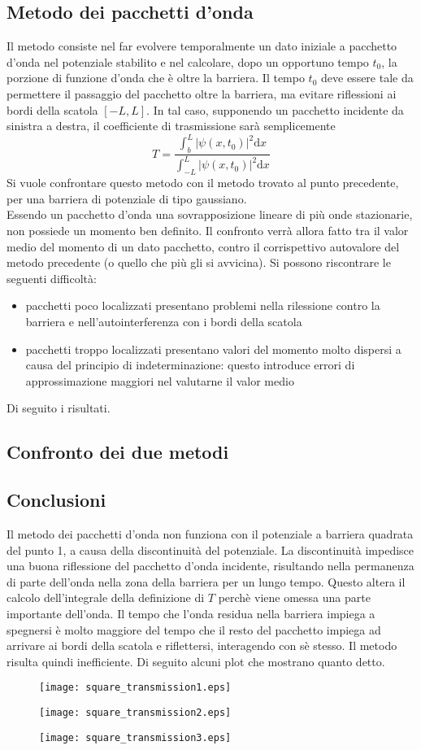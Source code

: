 \subsection*{Metodo dei pacchetti d'onda}
Il metodo consiste nel far evolvere temporalmente un dato iniziale a pacchetto
d'onda nel potenziale stabilito e nel calcolare, dopo un opportuno tempo $t_0$,
la porzione di funzione d'onda che è oltre la barriera. Il tempo $t_0$ deve essere tale
da permettere il passaggio del pacchetto oltre la barriera, ma evitare riflessioni
ai bordi della scatola $[-L,L]$.
In tal caso, supponendo un pacchetto incidente da sinistra a destra,
il coefficiente di trasmissione sarà semplicemente
    $$ T = \frac{\int_b^L |\psi(x,t_0)|^2\mathrm d x}{\int_{-L}^L |\psi(x,t_0)|^2\mathrm d x} $$
Si vuole confrontare questo metodo con il metodo trovato al punto precedente,
per una barriera di potenziale di tipo gaussiano.\\
Essendo un pacchetto d'onda una sovrapposizione lineare di più onde stazionarie,
non possiede un momento ben definito. Il confronto verrà allora fatto tra il valor medio
del momento di un dato pacchetto, contro il corrispettivo autovalore
del metodo precedente (o quello che più gli si avvicina).
Si possono riscontrare le seguenti difficoltà:
\begin{itemize}
    \item pacchetti poco localizzati presentano problemi nella rilessione contro la barriera
    e nell'autointerferenza con i bordi della scatola
    \item pacchetti troppo localizzati presentano valori del momento
    molto dispersi a causa del principio di indeterminazione:
    questo introduce errori di approssimazione maggiori nel valutarne il valor medio
\end{itemize}
\bigskip
Di seguito i risultati.\\
\subsection*{Confronto dei due metodi}

\subsection*{Conclusioni}
Il metodo dei pacchetti d'onda non funziona con il potenziale a barriera quadrata
del punto 1, a causa della discontinuità del potenziale. La discontinuità
impedisce una buona riflessione del pacchetto d'onda incidente, risultando nella
permanenza di parte dell'onda nella zona della barriera per un lungo tempo.
Questo altera il calcolo dell'integrale della definizione di $T$ perchè
viene omessa una parte importante dell'onda. Il tempo che l'onda residua nella barriera
impiega a spegnersi è molto maggiore del tempo che il resto del pacchetto impiega
ad arrivare ai bordi della scatola e riflettersi, interagendo con sè stesso.
Il metodo risulta quindi inefficiente. Di seguito alcuni plot che mostrano
quanto detto.

\begin{figure}[h]
 \texttt{[image: square\_transmission1.eps]}
\end{figure}
\begin{figure}[h]
 \texttt{[image: square\_transmission2.eps]}
\end{figure}
\begin{figure}[h]
 \texttt{[image: square\_transmission3.eps]}
\end{figure}
